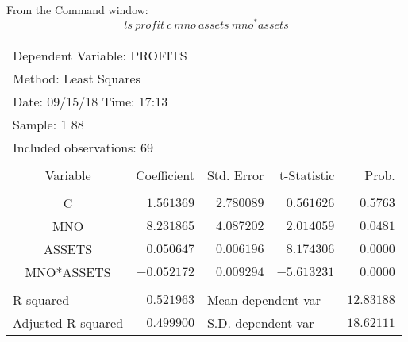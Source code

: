 \documentclass[12pt]{report}
\begin{document}
\noindent From the Command window:
$$ls\ profit\ c\ mno\ assets\ mno^*assets$$
\begin{figure}[H]
	\centering
\end{figure}
\vspace{-\baselineskip}
\begin{table}[!htbp]
	\centering
	\begin{tabular}{lrrrr}
		\multicolumn{3}{l}{Dependent Variable: PROFITS}&\multicolumn{1}{c}{}&\multicolumn{1}{c}{}\\
		\multicolumn{3}{l}{Method: Least Squares}&\multicolumn{1}{c}{}&\multicolumn{1}{c}{}\\
		\multicolumn{3}{l}{Date: 09/15/18   Time: 17:13}&\multicolumn{1}{c}{}&\multicolumn{1}{c}{}\\
		\multicolumn{2}{l}{Sample: 1 88}&\multicolumn{1}{c}{}&\multicolumn{1}{c}{}&\multicolumn{1}{c}{}\\
		\multicolumn{3}{l}{Included observations: 69}&\multicolumn{1}{c}{}&\multicolumn{1}{c}{}\\
		[4.5pt] \hline \\ [-4.5pt]
		\multicolumn{1}{c}{Variable}&\multicolumn{1}{r}{Coefficient}&\multicolumn{1}{r}{Std. Error}&\multicolumn{1}{r}{t-Statistic}&\multicolumn{1}{r}{Prob.}\\
		[4.5pt] \hline \\ [-4.5pt]
		\multicolumn{1}{c}{C}&\multicolumn{1}{r}{$1.561369$}&\multicolumn{1}{r}{$2.780089$}&\multicolumn{1}{r}{$0.561626$}&\multicolumn{1}{r}{$0.5763$}\\
		\multicolumn{1}{c}{MNO}&\multicolumn{1}{r}{$8.231865$}&\multicolumn{1}{r}{$4.087202$}&\multicolumn{1}{r}{$2.014059$}&\multicolumn{1}{r}{$0.0481$}\\
		\multicolumn{1}{c}{ASSETS}&\multicolumn{1}{r}{$0.050647$}&\multicolumn{1}{r}{$0.006196$}&\multicolumn{1}{r}{$8.174306$}&\multicolumn{1}{r}{$0.0000$}\\
		\multicolumn{1}{c}{MNO*ASSETS}&\multicolumn{1}{r}{$-0.052172$}&\multicolumn{1}{r}{$0.009294$}&\multicolumn{1}{r}{$-5.613231$}&\multicolumn{1}{r}{$0.0000$}\\
		[4.5pt] \hline \\ [-4.5pt]
		\multicolumn{1}{l}{R-squared}&\multicolumn{1}{r}{$0.521963$}&\multicolumn{2}{l}{Mean dependent var}&\multicolumn{1}{r}{$12.83188$}\\
		\multicolumn{1}{l}{Adjusted R-squared}&\multicolumn{1}{r}{$0.499900$}&\multicolumn{2}{l}{S.D. dependent var}&\multicolumn{1}{r}{$18.62111$}\\

\end{tabular}
\end{table}
\end{document}
